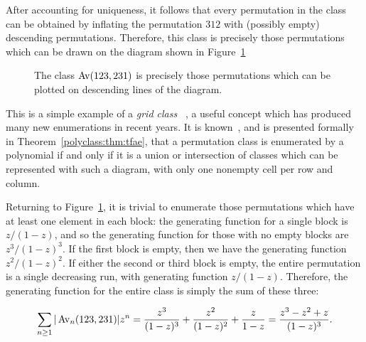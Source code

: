     After accounting for uniqueness, it follows that every permutation in the
    class can be obtained by inflating the permutation $312$ with (possibly
    empty) descending permutations. Therefore, this class is precisely those
    permutations which can be drawn on the diagram shown in
    Figure~\ref{prelim:fig:polygrid}


    \begin{figure}[t] \centering
    \caption{The class $\operatorname{{Av}}(123, 231)$ is precisely those permutations which can be
             plotted on descending lines of the diagram.}
    \label{prelim:fig:polygrid}
    \end{figure}

    This is a simple example of a \emph{grid class}
    ~\cite{MurphyVatter}, a useful concept which has produced many new
    enumerations in recent years. It is known~\cite{SophieVince,GridClasses},
    and is presented formally in Theorem~\ref{polyclass:thm:tfae}, that a
    permutation class is enumerated by a polynomial if and only if it is a
    union or intersection of classes which can be represented with such a
    diagram, with only one nonempty cell per row and column. 

    Returning to Figure~\ref{prelim:fig:polygrid}, it is trivial to enumerate
    those permutations which have at least one element in each block: the
    generating function for a single block is $z/(1-z)$, and so the
    generating function for those with no empty blocks are
    $z^3/(1-z)^3$. If the first block is empty, then we have the
    generating function $z^2/(1-z)^2$. If either the second or third
    block is empty, the entire permutation is a single decreasing run, with
    generating function $z/(1-z)$. Therefore, the generating function for
    the entire class is simply the sum of these three:

    \begin{equation} \label{prelim:eqn:polyclass}
      \sum_{n \geq 1} |\operatorname{{Av}}_n (123,231)| z^n = 
        \frac{z^3}{(1-z)^3} + \frac{z^2}{(1-z)^2} + \frac{z}{1-z} =
        \frac{z^3- z^2 + z}{(1-z)^3}.
    \end{equation}

